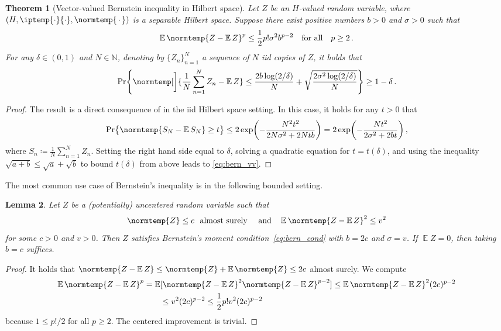 \documentclass{article}
\theoremstyle{plain}
\newtheorem{theorem}{Theorem}[section]
\newtheorem{lemma}[theorem]{Lemma}
\theoremstyle{my_def}
\theoremstyle{my_rem}
\numberwithin{equation}{section}
\numberwithin{theorem}{section}%
\newcommand{\E}{\mathbb{E}}
\newcommand{\N}{\mathbb{N}}
\let\originalleft\left %
\let\originalright\right
\renewcommand{\left}{\mathopen{}\mathclose\bgroup\originalleft}
\renewcommand{\right}{\aftergroup\egroup\originalright}
\newcommand{\ip}{\iptemp}
\newcommand{\norm}{\normtemp}
\newcommand{\slot}{{\,\cdot\,}}
\newcommand{\defeq}{\coloneqq} %
\renewcommand{\E}{\operatorname{\mathbb{E}}} %
\def\qa{\quad\text{and}\quad}
\begin{document}
\begin{theorem}[Vector-valued Bernstein inequality in Hilbert space]\label{thm:bern_vv}
Let $Z$ be an $H$-valued random variable, where $(H,\ip{\cdot}{\cdot},\norm{\slot})$ is a separable Hilbert space. Suppose there exist positive numbers $b>0$ and $\sigma>0$ such that 
\begin{equation}\label{eq:bern_cond}
    \E\norm{Z-\E Z}^p\leq \frac{1}{2}p!\sigma^2 b^{p-2} \quad\text{for all}\quad p\geq 2\,.
\end{equation}
For any $\delta\in(0,1)$ and $N\in\N$, denoting by $\{Z_n\}_{n=1}^N$ a sequence of $N$ iid copies of $Z$, it holds that
\begin{equation}\label{eq:bern_vv}
    \Pr\left\{\norm[\bigg]{\frac{1}{N}\sum_{n=1}^NZ_n - \E Z}\leq \frac{2b\log(2/\delta)}{N} + \sqrt{\frac{2\sigma^2\log(2/\delta)}{N}}\right\}\geq 1-\delta\,.
\end{equation}
\end{theorem}
\begin{proof}
    The result is a direct consequence of \citep[Cor. 1, p. 144]{pinelis1986remarks} in the iid Hilbert space setting. In this case, it holds for any $t>0$ that
    \begin{equation*}
        \Pr\bigl\{\norm{S_N-\E S_N}\geq t\bigr\}\leq 2\exp\biggl(-\frac{N^2t^2}{2N\sigma^2+2Nt b}\biggr)=2\exp\biggl(-\frac{Nt^2}{2\sigma^2+2bt}\biggr)\,,
    \end{equation*}
    where $S_n\defeq \frac{1}{N}\sum_{n=1}^N Z_n$. Setting the right hand side equal to $\delta$, solving a quadratic equation for $t=t(\delta)$, and using the inequality $\sqrt{a+b}\leq\sqrt{a} + \sqrt{b}$ to bound $t(\delta)$ from above leads to \eqref{eq:bern_vv}.
\end{proof}
The most common use case of Bernstein's inequality is in the following bounded setting.
\begin{lemma}\label{lem:bern_vv}
    Let $Z$ be a (potentially) uncentered random variable such that
    \begin{equation}\label{eq:lem_bern_vv_bdd}
        \norm{Z}\leq c \ \ \text{almost surely} \ \qa \E\norm{Z-\E Z}^2\leq v^2
    \end{equation}
    for some $c>0$ and $v>0$. Then $Z$ satisfies Bernstein's moment condition~\eqref{eq:bern_cond} with $b=2c$ and $\sigma = v$. If $\E Z=0$, then taking $b=c$ suffices.
\end{lemma}
\begin{proof}
    It holds that $\norm{Z-\E Z}\leq \norm{Z} + \E\norm{Z}\leq 2c$ almost surely. We compute
    \begin{align*}
        \E\norm{Z-\E Z}^p &= \E[\norm{Z-\E Z}^2 \norm{Z-\E Z}^{p-2}] \leq \E\norm{Z-\E Z}^2 (2c)^{p-2}\\
        &\qquad \leq v^2 (2c)^{p-2}\leq \frac{1}{2}p! v^2 (2c)^{p-2}
    \end{align*}
    because $1 \leq p!/2$ for all $p\geq 2$. The centered improvement is trivial.
\end{proof}
\end{document}
